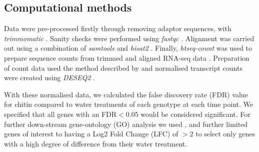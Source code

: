 \documentclass[../main.tex]{subfiles}
\begin{document}
\subsection{Computational methods}

Data were pre-processed firstly through removing adaptor sequences, with
\textit{trimmomatic} \cite{bolgerTrimmomaticFlexibleTrimmer2014}. Sanity checks
were performed using \textit{fastqc} \cite{andrewsBabrahamBioinformaticsFastQC}.
Alignment was carried out using a combination of \textit{samtools} and
\textit{hisat2} \cite{liSequenceAlignmentMap2009}. Finally, \textit{htseq-count}
was used to prepare sequence counts from trimmed and aligned RNA-seq data
\cite{kimHISATFastSpliced2015}. Preparation of count data used the method
described by \citet{loveModeratedEstimationFold2014a} and normalised transcript
counts were created using \textit{DESEQ2}
\cite{piperCountNormalizationDESeq22017}.

With these normalised data, we calculated the false discovery rate (FDR) value
for chitin compared to water treatments of each genotype at each time point. We
specified that all genes with an FDR$< 0.05$ would be considered significant.
For further down-stream gene-ontology (GO) analysis we used
\cite{klopfensteinGOATOOLSPythonLibrary2018}, and further limited genes of
interest to having a Log2 Fold Change (LFC) of $>2$ to select only genes with a
high degree of difference from their water treatment.
\end{document}
